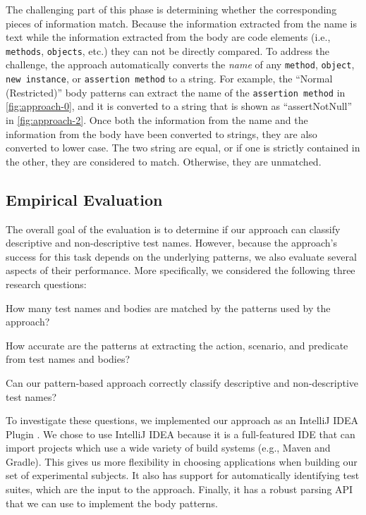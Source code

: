 \documentclass[proposal.tex]{subfiles}
\begin{document}
The challenging part of this phase is determining whether the corresponding pieces of information match.
%
Because the information extracted from the name is text while the information extracted from the body are code elements (i.e., \texttt{methods}, \texttt{objects}, etc.) they can not be directly compared.
%
To address the challenge, the approach automatically converts the \emph{name} of any \texttt{method}, \texttt{object}, \texttt{new instance}, or \texttt{assertion method} to a string.
%
For example, the \enquote{Normal (Restricted)} body patterns can extract the name of the \texttt{assertion method} in \cref{fig:approach-0}, and it is converted to a string that is shown as \enquote{assertNotNull} in \cref{fig:approach-2}.
%
Once both the information from the name and the information from the body have been converted to strings, they are also converted to lower case.
%
The two string are equal, or if one is strictly contained in the other, they are considered to match.
%
Otherwise, they are unmatched.

\subsection{Empirical Evaluation}
\label{sec:evaluation}


The overall goal of the evaluation is to determine if our approach can classify descriptive and non-descriptive test names. 
%
However, because the approach's success for this task depends on the underlying patterns, we also evaluate several aspects of their performance.
%
More specifically, we considered the following three research questions:
\begin{description}[font=\normalfont\emph]
\item[RQ1---Feasibility.] How many test names and bodies are matched by the patterns used by the approach?
\item[RQ2---Accuracy.] How accurate are the patterns at extracting the action, scenario, and predicate from test names and bodies?
\item[RQ3---Effectiveness.] Can our pattern-based approach correctly classify descriptive and non-descriptive test names?
\end{description}


To investigate these questions, we implemented our approach as an IntelliJ IDEA Plugin \cite{IntelliJPlugin}.
%
We chose to use IntelliJ IDEA because it is a full-featured IDE that can import projects which use a wide variety of build systems (e.g., Maven and Gradle).
%
This gives us more flexibility in choosing applications when building our set of experimental subjects.
%
It also has support for automatically identifying test suites, which are the input to the approach.
%
Finally, it has a robust parsing API that we can use to implement the body patterns.
\end{document}
